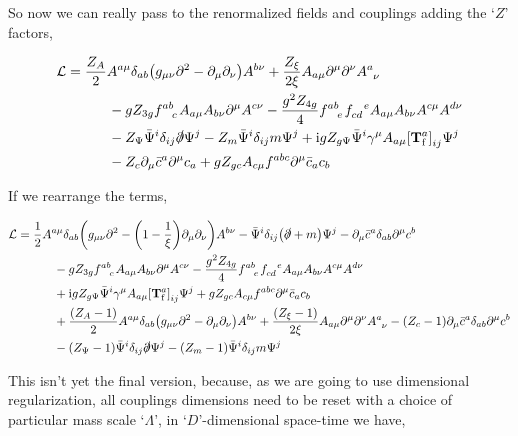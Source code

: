 So now we can really pass to the renormalized fields and couplings adding the `$Z$' factors,

\begin{align}
    \mathcal L&=\frac{Z_A}{2}A^{a\mu}\delta_{ab}\qty(g_{\mu\nu}\partial^2 -\partial_\mu\partial_\nu )A^{b\nu}+\frac{Z_\xi}{2\xi} A_{a\mu}\partial^\mu\partial^\nu \tensor{A}{^a_\nu}\nonumber\\
    &\quad\quad\quad-gZ_{3g}\tensor{f}{^a^b_c}A_{a\mu}A_{b\nu}\partial^\mu A^{c\nu}-\frac{g^2Z_{4g}}{4}\tensor{f}{^a^b_e}\tensor{f}{_c_d^e}A_{a\mu}A_{b\nu}A^{c\mu}A^{d\nu}\nonumber\\
    &\quad\quad\quad-Z_\Psi\bar{\Psi}^i\delta_{ij}\slashed\partial\Psi^j-Z_m\bar{\Psi}^i\delta_{ij}m\Psi^j+\im gZ_{g\Psi}\bar{\Psi}^i\gamma^\mu A_{a\mu}\tensor{\qty[\vb T^a_{\textnormal f}]}{_i_j}\Psi^j\nonumber\\
    &\quad\quad\quad -Z_c\partial_\mu\bar c^a\partial^\mu c_a+gZ_{gc} A_{c\mu}\tensor{f}{^a^b^c}\partial^\mu \bar c_ac_b
\end{align}

If we rearrange the terms,

\begin{align}
    \mathcal L&=\frac{1}{2}A^{a\mu}\delta_{ab}\qty(g_{\mu\nu}\partial^2 -\qty(1-\frac1\xi)\partial_\mu\partial_\nu )A^{b\nu}-\bar{\Psi}^i\delta_{ij}\qty(\slashed\partial+m)\Psi^j-\partial_\mu\bar c^a\delta_{ab}\partial^\mu c^b\nonumber\\
    &\quad\quad\quad-gZ_{3g}\tensor{f}{^a^b_c}A_{a\mu}A_{b\nu}\partial^\mu A^{c\nu}-\frac{g^2Z_{4g}}{4}\tensor{f}{^a^b_e}\tensor{f}{_c_d^e}A_{a\mu}A_{b\nu}A^{c\mu}A^{d\nu}\nonumber\\
    &\quad\quad\quad+\im gZ_{g\Psi}\bar{\Psi}^i\gamma^\mu A_{a\mu}\tensor{\qty[\vb T^a_{\textnormal f}]}{_i_j}\Psi^j+gZ_{gc} A_{c\mu}\tensor{f}{^a^b^c}\partial^\mu \bar c_ac_b\nonumber\\
    &\quad\quad\quad +\frac{\qty(Z_A-1)}{2}A^{a\mu}\delta_{ab}\qty(g_{\mu\nu}\partial^2 -\partial_\mu\partial_\nu )A^{b\nu}+\frac{\qty(Z_\xi-1)}{2\xi} A_{a\mu}\partial^\mu\partial^\nu \tensor{A}{^a_\nu}-\qty(Z_c-1)\partial_\mu\bar c^a\delta_{ab}\partial^\mu c^b\nonumber\\
    &\quad\quad\quad-\qty(Z_\Psi-1)\bar{\Psi}^i\delta_{ij}\slashed\partial\Psi^j-\qty(Z_m-1)\bar{\Psi}^i\delta_{ij}m\Psi^j
\end{align}

This isn't yet the final version, because, as we are going to use dimensional regularization, all couplings dimensions need to be reset with a choice of particular mass scale `$\Lambda$', in `$D$'-dimensional space-time we have,

